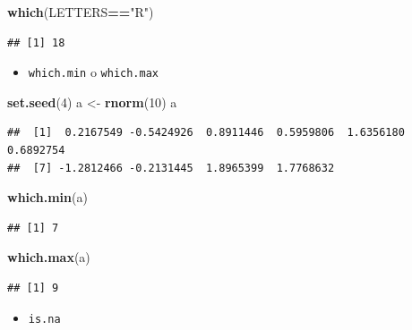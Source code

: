 \documentclass[]{book}
\newenvironment{Shaded}{\begin{snugshade}}{\end{snugshade}}
\newcommand{\KeywordTok}[1]{\textcolor[rgb]{0.13,0.29,0.53}{\textbf{#1}}}
\newcommand{\DecValTok}[1]{\textcolor[rgb]{0.00,0.00,0.81}{#1}}
\newcommand{\StringTok}[1]{\textcolor[rgb]{0.31,0.60,0.02}{#1}}
\newcommand{\OperatorTok}[1]{\textcolor[rgb]{0.81,0.36,0.00}{\textbf{#1}}}
\newcommand{\NormalTok}[1]{#1}
\providecommand{\tightlist}{%
  \setlength{\itemsep}{0pt}\setlength{\parskip}{0pt}}
\begin{document}
\begin{Shaded}
\begin{Highlighting}[]
\KeywordTok{which}\NormalTok{(LETTERS}\OperatorTok{==}\StringTok{"R"}\NormalTok{)}
\end{Highlighting}
\end{Shaded}

\begin{verbatim}
## [1] 18
\end{verbatim}

\begin{itemize}
\tightlist
\item
  \texttt{which.min} o \texttt{which.max}
\end{itemize}

\begin{Shaded}
\begin{Highlighting}[]
\KeywordTok{set.seed}\NormalTok{(}\DecValTok{4}\NormalTok{)}
\NormalTok{a <-}\StringTok{ }\KeywordTok{rnorm}\NormalTok{(}\DecValTok{10}\NormalTok{)}
\NormalTok{a}
\end{Highlighting}
\end{Shaded}

\begin{verbatim}
##  [1]  0.2167549 -0.5424926  0.8911446  0.5959806  1.6356180  0.6892754
##  [7] -1.2812466 -0.2131445  1.8965399  1.7768632
\end{verbatim}

\begin{Shaded}
\begin{Highlighting}[]
\KeywordTok{which.min}\NormalTok{(a)}
\end{Highlighting}
\end{Shaded}

\begin{verbatim}
## [1] 7
\end{verbatim}

\begin{Shaded}
\begin{Highlighting}[]
\KeywordTok{which.max}\NormalTok{(a)}
\end{Highlighting}
\end{Shaded}

\begin{verbatim}
## [1] 9
\end{verbatim}

\begin{itemize}
\tightlist
\item
  \texttt{is.na}
\end{itemize}
\end{document}
